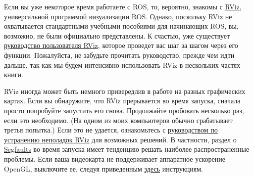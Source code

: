 

Если вы уже некоторое время работаете с ROS, то, вероятно, знакомы с \href{http://wiki.ros.org/rviz}{RViz}, универсальной программой визуализации ROS. Однако, поскольку RViz не охватывается стандартными учебными пособиями для начинающих ROS, вы, возможно, не были официально представлены. К счастью, уже существует \href{http://ros.org/doc/indigo/api/rviz/html/user_guide/}{руководство пользователя RViz}, которое проведет вас шаг за шагом через его функции. Пожалуйста, не забудьте прочитать руководство, прежде чем идти дальше, так как мы будем интенсивно использовать RViz в нескольких частях книги.

RViz иногда может быть немного привередлив в работе на разных графических картах. Если вы обнаружите, что RViz прерывается во время запуска, сначала просто попробуйте запустить его снова. Продолжайте пробовать несколько раз, если это необходимо. (На одном из моих компьютеров обычно срабатывает третья попытка.) Если это не удается, ознакомьтесь с \href{http://ros.org/wiki/rviz/Troubleshooting}{руководством по устранению неполадок RViz} для возможных решений. В частности, раздел о \href{http://ros.org/wiki/rviz/Troubleshooting%23Segfault_during_startup}{Segfaults} во время запуска имеет тенденцию решать наиболее распространенные проблемы. Если ваша видеокарта не поддерживает аппаратное ускорение OpenGL, выключите ее, следуя приведенным \href{http://wiki.ros.org/rviz/Troubleshooting%23Turning_off_hardware_acceleration}{здесь} инструкциям.

